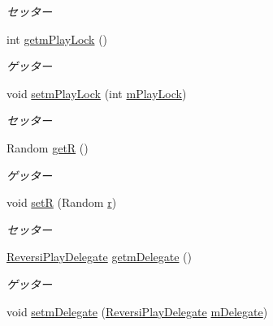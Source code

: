 \begin{DoxyCompactItemize}
\begin{DoxyCompactList}\small\item\em セッター \end{DoxyCompactList}\item 
int \hyperlink{classjp_1_1gr_1_1java__conf_1_1yuta__yoshinaga_1_1reversi_1_1model_1_1_reversi_play_aa2222e7c7de9ab1b0d705c16083e8de4}{getm\+Play\+Lock} ()
\begin{DoxyCompactList}\small\item\em ゲッター \end{DoxyCompactList}\item 
void \hyperlink{classjp_1_1gr_1_1java__conf_1_1yuta__yoshinaga_1_1reversi_1_1model_1_1_reversi_play_abd7812c4b8e0708b18e666620973b000}{setm\+Play\+Lock} (int \hyperlink{classjp_1_1gr_1_1java__conf_1_1yuta__yoshinaga_1_1reversi_1_1model_1_1_reversi_play_afcee71f4d450a6a847bb2873182d1170}{m\+Play\+Lock})
\begin{DoxyCompactList}\small\item\em セッター \end{DoxyCompactList}\item 
Random \hyperlink{classjp_1_1gr_1_1java__conf_1_1yuta__yoshinaga_1_1reversi_1_1model_1_1_reversi_play_a708074b0190130ffbd86efd2808eac86}{getR} ()
\begin{DoxyCompactList}\small\item\em ゲッター \end{DoxyCompactList}\item 
void \hyperlink{classjp_1_1gr_1_1java__conf_1_1yuta__yoshinaga_1_1reversi_1_1model_1_1_reversi_play_ac0a21805d156fefa61576a64715ac778}{setR} (Random \hyperlink{classjp_1_1gr_1_1java__conf_1_1yuta__yoshinaga_1_1reversi_1_1model_1_1_reversi_play_afc4ee44989d16e8f8c56a199fb80f16a}{r})
\begin{DoxyCompactList}\small\item\em セッター \end{DoxyCompactList}\item 
\hyperlink{classjp_1_1gr_1_1java__conf_1_1yuta__yoshinaga_1_1reversi_1_1model_1_1_reversi_play_delegate}{Reversi\+Play\+Delegate} \hyperlink{classjp_1_1gr_1_1java__conf_1_1yuta__yoshinaga_1_1reversi_1_1model_1_1_reversi_play_a743606fc2f261d7303c76264c42c2ab0}{getm\+Delegate} ()
\begin{DoxyCompactList}\small\item\em ゲッター \end{DoxyCompactList}\item 
void \hyperlink{classjp_1_1gr_1_1java__conf_1_1yuta__yoshinaga_1_1reversi_1_1model_1_1_reversi_play_adcfa7bddbb634a7408a9e85fe757bda3}{setm\+Delegate} (\hyperlink{classjp_1_1gr_1_1java__conf_1_1yuta__yoshinaga_1_1reversi_1_1model_1_1_reversi_play_delegate}{Reversi\+Play\+Delegate} \hyperlink{classjp_1_1gr_1_1java__conf_1_1yuta__yoshinaga_1_1reversi_1_1model_1_1_reversi_play_abce9d23f34eb5999c2750c817cd38311}{m\+Delegate})

\end{DoxyCompactItemize}
